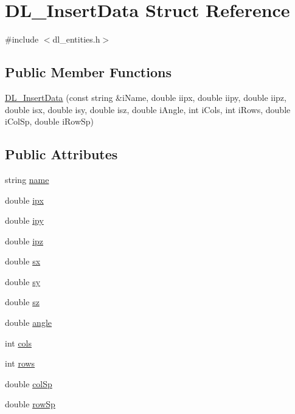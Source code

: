 \hypertarget{structDL__InsertData}{\section{D\-L\-\_\-\-Insert\-Data Struct Reference}
\label{structDL__InsertData}
}


{\ttfamily \#include $<$dl\-\_\-entities.\-h$>$}

\subsection*{Public Member Functions}
\begin{DoxyCompactItemize}
\item 
\hyperlink{structDL__InsertData_a3ad39d307a03904f35448a29b3ac2418}{D\-L\-\_\-\-Insert\-Data} (const string \&i\-Name, double iipx, double iipy, double iipz, double isx, double isy, double isz, double i\-Angle, int i\-Cols, int i\-Rows, double i\-Col\-Sp, double i\-Row\-Sp)
\end{DoxyCompactItemize}
\subsection*{Public Attributes}
\begin{DoxyCompactItemize}
\item 
string \hyperlink{structDL__InsertData_a4c9641ecc8dfaf3372d31ca68bb5e66e}{name}
\item 
double \hyperlink{structDL__InsertData_aa121a1cac14afd89d3043deefe118330}{ipx}
\item 
double \hyperlink{structDL__InsertData_a4a02e2c86a73ee0a812fd8ec4e8958a6}{ipy}
\item 
double \hyperlink{structDL__InsertData_a8e7f2d90779ab08c9b85ee70224cffd4}{ipz}
\item 
double \hyperlink{structDL__InsertData_a5b6425a71fbe72ae95a5e056cfb71234}{sx}
\item 
double \hyperlink{structDL__InsertData_a163d354ac49b3c0d9c8b662dbdb8e714}{sy}
\item 
double \hyperlink{structDL__InsertData_a1327793a622ab705f4f09327fdc062f4}{sz}
\item 
double \hyperlink{structDL__InsertData_ad7e66cd816c2ee74fbcc32f24789f335}{angle}
\item 
int \hyperlink{structDL__InsertData_a88b9829b19d977ef1845927e0c316cd0}{cols}
\item 
int \hyperlink{structDL__InsertData_a8fa9228cac1d31f0f1208ecef03b693e}{rows}
\item 
double \hyperlink{structDL__InsertData_ad4e8ba5a5594c095459196304143a406}{col\-Sp}
\item 
double \hyperlink{structDL__InsertData_a71f591f05ad0f379f24bf04334e55941}{row\-Sp}
\end{DoxyCompactItemize}


